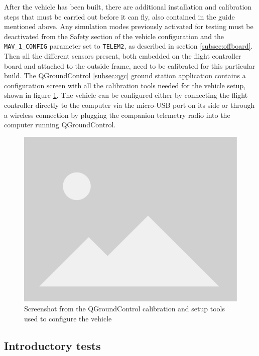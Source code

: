 After the vehicle has been built, there are additional installation and calibration steps that must be carried out before it can fly, also contained in the guide mentioned above.
Any simulation modes previously activated for testing must be deactivated from the Safety section of the vehicle configuration and the \texttt{MAV\_1\_CONFIG} parameter set to \texttt{TELEM2}, as described in section \ref{subsec:offboard}.
Then all the different sensors present, both embedded on the flight controller board and attached to the outside frame, need to be calibrated for this particular build.
The QGroundControl \ref{subsec:qgc} ground station application contains a configuration screen with all the calibration tools needed for the vehicle setup, shown in figure \ref{fig:qgc-config}.
The vehicle can be configured either by connecting the flight controller directly to the computer via the micro-USB port on its side or through a wireless connection by plugging the companion telemetry radio into the computer running QGroundControl.


\begin{figure}
  \centering
  \includegraphics[width=\textwidth, keepaspectratio]{img/placeholder.png}
  \caption{Screenshot from the QGroundControl calibration and setup tools used to configure the vehicle}\label{fig:qgc-config}
\end{figure}


\subsection{Introductory tests}
\label{sec:test-8-flight}

